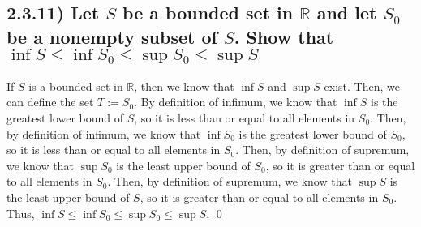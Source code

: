 \documentclass[11pt]{article}
\newcommand{\R}{\mathbb{R}}    %
\begin{document}
\subsection*{2.3.11) \quad Let $S$ be a bounded set in $\R$ and let $S_0$ be a nonempty subset of $S$. Show that $\inf{S} \leq \inf{S_0} \leq \sup{S_0} \leq \sup{S}$}
    If $S$ is a bounded set in $\R$, then we know that $\inf{S}$ and $\sup{S}$ exist. Then, we can define the set $T:=S_0$. By definition of infimum, we know that $\inf{S}$ is the greatest lower bound of $S$, so it is less than or equal to all elements in $S_0$. Then, by definition of infimum, we know that $\inf{S_0}$ is the greatest lower bound of $S_0$, so it is less than or equal to all elements in $S_0$. Then, by definition of supremum, we know that $\sup{S_0}$ is the least upper bound of $S_0$, so it is greater than or equal to all elements in $S_0$. Then, by definition of supremum, we know that $\sup{S}$ is the least upper bound of $S$, so it is greater than or equal to all elements in $S_0$. Thus, $\inf{S} \leq \inf{S_0} \leq \sup{S_0} \leq \sup{S}$. \qed
\end{document}
